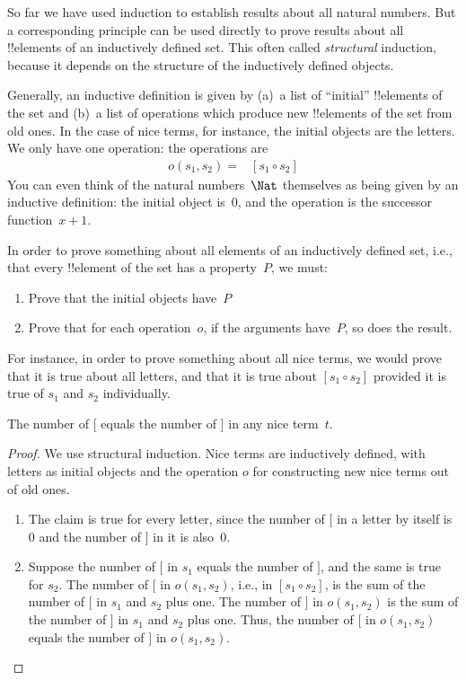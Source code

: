 \documentclass[../../../include/open-logic-section]{subfiles}
\begin{document}


So far we have used induction to establish results about all natural
numbers. But a corresponding principle can be used directly to prove
results about all !!{element}s of an inductively defined set.  This
often called \emph{structural} induction, because it depends on the
structure of the inductively defined objects.

Generally, an inductive definition is given by (a)~a list of
``initial'' !!{element}s of the set and (b)~a list of operations which
produce new !!{element}s of the set from old ones. In the case of nice
terms, for instance, the initial objects are the letters. We only have
one operation: the operations are
\begin{align*}
  o(s_1, s_2) = & [s_1 \circ s_2]
\end{align*}
You can even think of the natural numbers~$\Nat$ themselves as being
given by an inductive definition: the initial object is~$0$, and the
operation is the successor function~$x + 1$.

In order to prove something about all elements of an inductively
defined set, i.e., that every !!{element} of the set has a
property~$P$, we must:
\begin{enumerate}
\item Prove that the initial objects have~$P$
\item Prove that for each operation~$o$, if the arguments have~$P$,
  so does the result.
\end{enumerate}
For instance, in order to prove something about all nice terms, we
would prove that it is true about all letters, and that it is true
about $[s_1 \circ s_2]$ provided it is true of $s_1$ and $s_2$
individually.

\begin{prop}
  The number of $[$ equals the number of $]$ in any nice term~$t$.
\end{prop}

\begin{proof}
We use structural induction.  Nice terms are inductively defined, with
letters as initial objects and the operation $o$ for constructing new
nice terms out of old ones.
\begin{enumerate}
\item The claim is true for every letter, since the number of $[$ in a
  letter by itself is~$0$ and the number of $]$ in it is also~$0$.
\item Suppose the number of $[$ in $s_1$ equals the number of $]$, and
  the same is true for $s_2$. The number of $[$ in $o(s_1, s_2)$, i.e., in
    $[s_1 \circ s_2]$, is the sum of the number of $[$ in $s_1$ and
      $s_2$ plus one. The number of $]$ in $o(s_1, s_2)$ is the sum of the number
    of $]$ in $s_1$ and $s_2$ plus one. Thus, the number of $[$ in $o(s_1, s_2)$
    equals the number of $]$ in $o(s_1,s_2)$.
\end{enumerate}
\end{proof}
\end{document}
